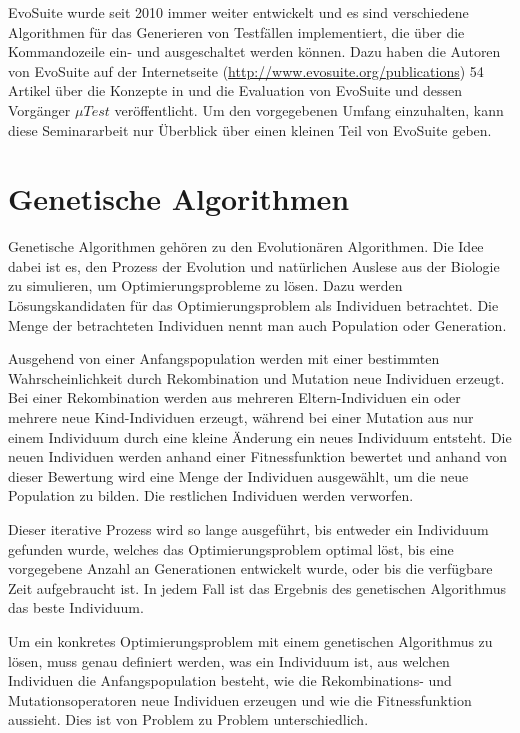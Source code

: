 \documentclass[a4paper,11pt]{article}
\begin{document}
EvoSuite wurde seit 2010 immer weiter entwickelt und es sind verschiedene Algorithmen für das Generieren von Testfällen implementiert, die über die Kommandozeile ein- und ausgeschaltet werden können.
Dazu haben die Autoren von EvoSuite auf der Internetseite (\url{http://www.evosuite.org/publications}) 54 Artikel über die Konzepte in und die Evaluation von EvoSuite und dessen Vorgänger ${\mu}Test$ veröffentlicht.
Um den vorgegebenen Umfang einzuhalten, kann diese Seminararbeit nur Überblick über einen kleinen Teil von EvoSuite geben.

\section{Genetische Algorithmen}
\label{sec:genetische_algorithmen}

Genetische Algorithmen gehören zu den Evolutionären Algorithmen.
Die Idee dabei ist es, den Prozess der Evolution und natürlichen Auslese aus der Biologie zu simulieren, um Optimierungsprobleme zu lösen.
Dazu werden Lösungskandidaten für das Optimierungsproblem als Individuen betrachtet.
Die Menge der betrachteten Individuen nennt man auch Population oder Generation.

Ausgehend von einer Anfangspopulation werden mit einer bestimmten Wahrscheinlichkeit durch Rekombination und Mutation neue Individuen erzeugt.
Bei einer Rekombination werden aus mehreren Eltern-Individuen ein oder mehrere neue Kind-Individuen erzeugt, während bei einer Mutation aus nur einem Individuum durch eine kleine Änderung ein neues Individuum entsteht.
Die neuen Individuen werden anhand einer Fitnessfunktion bewertet und anhand von dieser Bewertung wird eine Menge der Individuen ausgewählt, um die neue Population zu bilden.
Die restlichen Individuen werden verworfen.

Dieser iterative Prozess wird so lange ausgeführt, bis entweder ein Individuum gefunden wurde, welches das Optimierungsproblem optimal löst, bis eine vorgegebene Anzahl an Generationen entwickelt wurde, oder bis die verfügbare Zeit aufgebraucht ist.
In jedem Fall ist das Ergebnis des genetischen Algorithmus das beste Individuum.

Um ein konkretes Optimierungsproblem mit einem genetischen Algorithmus zu lösen, muss genau definiert werden, was ein Individuum ist, aus welchen Individuen die Anfangspopulation besteht, wie die Rekombinations- und Mutationsoperatoren neue Individuen erzeugen und wie die Fitnessfunktion aussieht.
Dies ist von Problem zu Problem unterschiedlich.
\end{document}
